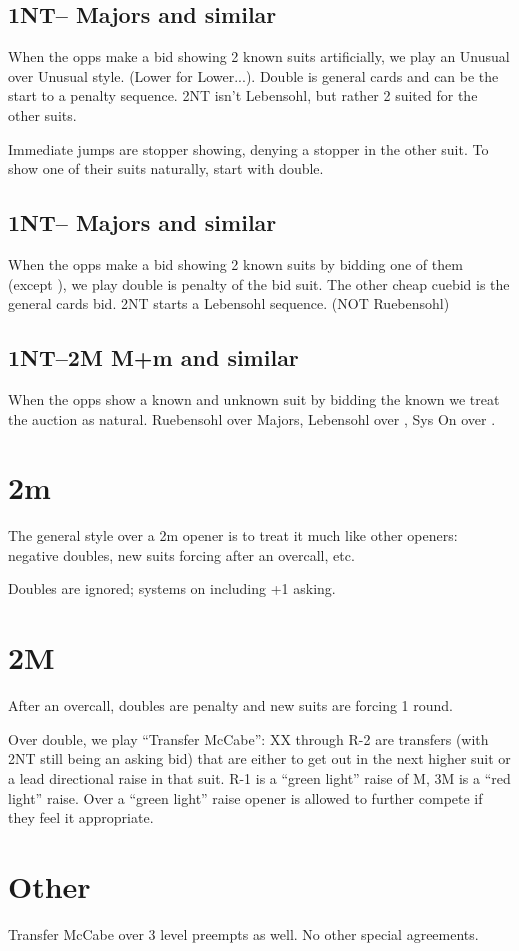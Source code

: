 \documentclass[tom-ari]{subfile}
\begin{document}
	\subsection{1NT-- Majors and similar}
	
	When the opps make a bid showing 2 known suits artificially, we play an Unusual over Unusual style. (Lower for Lower...). Double is general cards and can be the start to a penalty sequence. 2NT isn't Lebensohl, but rather 2 suited for the other suits.
	
	Immediate jumps are stopper showing, denying a stopper in the other suit. To show one of their suits naturally, start with double.
	
	\subsection{1NT-- Majors and similar}
	
	When the opps make a bid showing 2 known suits by bidding one of them (except ), we play double is penalty of the bid suit. The other cheap cuebid is the general cards bid. 2NT starts a Lebensohl sequence. (NOT Ruebensohl)
	
	
	\subsection{1NT--2M M+m and similar}
	
	When the opps show a known and unknown suit by bidding the known we treat the auction as natural. Ruebensohl over Majors, Lebensohl over \diamondsuit, Sys On over \clubsuit.

	
	\section{2m}
	
	The general style over a 2m opener is to treat it much like other openers: negative doubles, new suits forcing after an overcall, etc.
	
	Doubles are ignored; systems on including +1 asking.
	
	\section{2M}
	
	After an overcall, doubles are penalty and new suits are forcing 1 round.
	
	Over double, we play ``Transfer McCabe'': XX through R-2 are transfers (with 2NT still being an asking bid) that are either to get out in the next higher suit or a lead directional raise in that suit. R-1 is a ``green light'' raise of M, 3M is a ``red light'' raise. Over a ``green light'' raise opener is allowed to further compete if they feel it appropriate.
	
	\section{Other}
	
	Transfer McCabe over 3 level preempts as well. No other special agreements.
	
\end{document}
